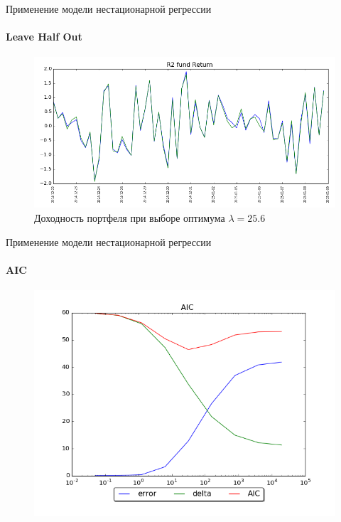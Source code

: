 \documentclass[11pt]{beamer}
\begin{document}
\begin{frame}{Применение модели нестационарной регрессии}
\framesubtitle{Leave Half Out}

\begin{figure}
\centering
\includegraphics[scale=0.38]{lho_return.png}
\caption{Доходность портфеля при выборе оптимума $\lambda=25.6$}
\end{figure}
\end{frame}

\begin{frame}{Применение модели нестационарной регрессии}
\framesubtitle{AIC}
\begin{figure}
\centering
\includegraphics[scale=0.4]{aic_r2.png}
\end{figure}
\end{frame}
\end{document}
